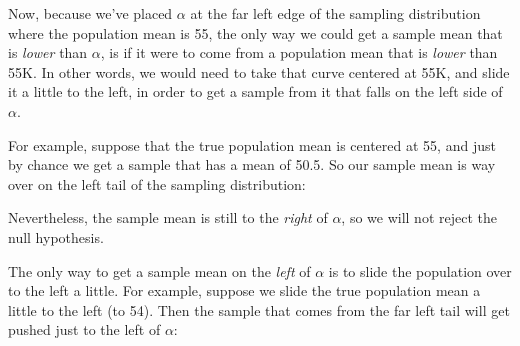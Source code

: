 \documentclass[../../../main.tex]{subfiles}
\begin{document}
Now, because we've placed $\alpha$ at the far left edge of the sampling distribution where the population mean is 55, the only way we could get a sample mean that is \emph{lower} than $\alpha$, is if it were to come from a population mean that is \emph{lower} than 55K. In other words, we would need to take that curve centered at 55K, and slide it a little to the left, in order to get a sample from it that falls on the left side of $\alpha$.

For example, suppose that the true population mean is centered at 55, and just by chance we get a sample that has a mean of 50.5. So our sample mean is way over on the left tail of the sampling distribution:

\begin{center}
\end{center}

\noindent
Nevertheless, the sample mean is still to the \emph{right} of $\alpha$, so we will not reject the null hypothesis.

The only way to get a sample mean on the \emph{left} of $\alpha$ is to slide the population over to the left a little. For example, suppose we slide the true population mean a little to the left (to 54). Then the sample that comes from the far left tail will get pushed just to the left of $\alpha$:
\end{document}
